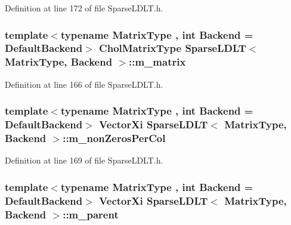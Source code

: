 Definition at line 172 of file Sparse\-L\-D\-L\-T.\-h.

\hypertarget{class_sparse_l_d_l_t_ada2dfc8166ec0fe44e853d12c8f6ee33}{
\subsubsection[{m\-\_\-matrix}]{\setlength{\rightskip}{0pt plus 5cm}template$<$typename Matrix\-Type , int Backend = Default\-Backend$>$ {\bf Chol\-Matrix\-Type} {\bf Sparse\-L\-D\-L\-T}$<$ Matrix\-Type, Backend $>$\-::m\-\_\-matrix\hspace{0.3cm}{\ttfamily [protected]}}}\label{class_sparse_l_d_l_t_ada2dfc8166ec0fe44e853d12c8f6ee33}


Definition at line 166 of file Sparse\-L\-D\-L\-T.\-h.

\hypertarget{class_sparse_l_d_l_t_a2d8a76968b4baeed0260e3a589a61045}{
\subsubsection[{m\-\_\-non\-Zeros\-Per\-Col}]{\setlength{\rightskip}{0pt plus 5cm}template$<$typename Matrix\-Type , int Backend = Default\-Backend$>$ Vector\-Xi {\bf Sparse\-L\-D\-L\-T}$<$ Matrix\-Type, Backend $>$\-::m\-\_\-non\-Zeros\-Per\-Col\hspace{0.3cm}{\ttfamily [protected]}}}\label{class_sparse_l_d_l_t_a2d8a76968b4baeed0260e3a589a61045}


Definition at line 169 of file Sparse\-L\-D\-L\-T.\-h.

\hypertarget{class_sparse_l_d_l_t_ae4425b946f8df375312e199321fad8bd}{
\subsubsection[{m\-\_\-parent}]{\setlength{\rightskip}{0pt plus 5cm}template$<$typename Matrix\-Type , int Backend = Default\-Backend$>$ Vector\-Xi {\bf Sparse\-L\-D\-L\-T}$<$ Matrix\-Type, Backend $>$\-::m\-\_\-parent\hspace{0.3cm}{\ttfamily [protected]}}}\label{class_sparse_l_d_l_t_ae4425b946f8df375312e199321fad8bd}


